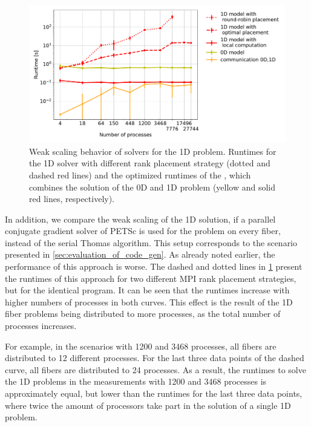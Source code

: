 \begin{figure}
  \centering%
  \includegraphics[width=\textwidth]{images/results/studies/Comparisonof0D-1Dcomputationschemes.pdf}%
  \caption{Weak scaling behavior of solvers for the 1D problem. Runtimes for the 1D solver with different rank placement strategy (dotted and dashed red lines) and the optimized runtimes of the , which combines the solution of the 0D and 1D problem (yellow and solid red lines, respectively).}%
   \label{fig:hazel_hen_rank_placement}%
\end{figure}

In addition, we compare the weak scaling of the 1D solution, if a parallel conjugate gradient solver of PETSc is used for the problem on every fiber, instead of the serial Thomas algorithm. This setup corresponds to the  scenario presented in \cref{sec:evaluation_of_code_gen}. As already noted earlier, the performance of this approach is worse. The dashed and dotted lines in \cref{fig:hazel_hen_rank_placement} present the runtimes of this approach for two different MPI rank placement strategies, but for the identical program. It can be seen that the runtimes increase with higher numbers of processes in both curves. This effect is the result of the 1D fiber problems being distributed to more processes, as the total number of processes increases. 

For example, in the scenarios with 1200 and 3468 processes, all fibers are distributed to 12 different processes. For the last three data points of the dashed curve, all fibers are distributed to 24 processes. As a result, the runtimes to solve the 1D problems in the measurements with 1200 and 3468 processes is approximately equal, but lower than the runtimes for the last three data points, where twice the amount of processors take part in the solution of a single 1D problem.

